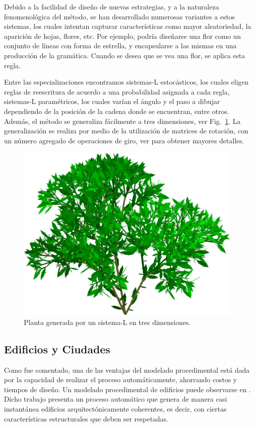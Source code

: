 Debido a la facilidad de diseño de nuevas estrategias, y a la naturaleza fenomenológica del método, se han desarrollado numerosas variantes a estos sistemas, los cuales intentan capturar características como mayor aleatoriedad, la aparición de hojas, flores, etc.
Por ejemplo, podría diseñarse una flor como un conjunto de líneas con forma de estrella, y encapsularse a las mismas en una producción de la gramática.
Cuando se desea que se vea una flor, se aplica esta regla.


Entre las especializaciones encontramos sistemas-L estocásticos, los cuales eligen reglas de reescritura de acuerdo a una probabilidad asignada a cada regla, sistemas-L paramétricos, los cuales varían el ángulo y el paso a dibujar dependiendo de la posición de la cadena donde se encuentran, entre otros.
Además, el método se generaliza fácilmente a tres dimensiones, ver Fig.~\ref{fg:sistemasL3D}.
La generalización se realiza por medio de la utilización de matrices de rotación, con un número agregado de operaciones de giro, ver \cite{Prusinkiewicz1990} para obtener mayores detalles.

\begin{figure}
\center
\includegraphics[width=11cm]{figures/3dlsystem}
\caption[Sistema-L en tres dimensiones.]{Planta generada por un sistema-L en tres dimensiones.}
\label{fg:sistemasL3D}
\end{figure}

\subsection{Edificios y Ciudades}
Como fue comentado, una de las ventajas del modelado procedimental está dada por la capacidad de realizar el proceso automáticamente, ahorrando costos y tiempos de diseño.
Un modelado procedimental de edificios puede observarse en \cite{Wonka2003}.
Dicho trabajo presenta un proceso automático que genera de manera casi instantánea edificios arquitectónicamente coherentes, es decir, con ciertas características estructurales que deben ser respetadas.

